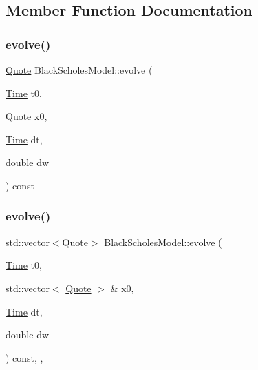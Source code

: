 \subsection{Member Function Documentation}
\hypertarget{class_black_scholes_model_abcbe5f02a1820adf876b1981c78dc43a}{}\label{class_black_scholes_model_abcbe5f02a1820adf876b1981c78dc43a} 
\subsubsection{\texorpdfstring{evolve()}{evolve()}\hspace{0.1cm}{\footnotesize\ttfamily [1/2]}}
{\footnotesize\ttfamily \hyperlink{_name_def_8h_a642a6c5fd87319d922637de0e0bb0305}{Quote} Black\+Scholes\+Model\+::evolve (\begin{DoxyParamCaption}\item[{\hyperlink{_name_def_8h_ac2d3e0ba793497bcca555c7c2cf64ff3}{Time}}]{t0,  }\item[{\hyperlink{_name_def_8h_a642a6c5fd87319d922637de0e0bb0305}{Quote}}]{x0,  }\item[{\hyperlink{_name_def_8h_ac2d3e0ba793497bcca555c7c2cf64ff3}{Time}}]{dt,  }\item[{double}]{dw }\end{DoxyParamCaption}) const}

\hypertarget{class_black_scholes_model_ae7ece51fd9f0eac3f77975cff857216d}{}\label{class_black_scholes_model_ae7ece51fd9f0eac3f77975cff857216d} 
\subsubsection{\texorpdfstring{evolve()}{evolve()}\hspace{0.1cm}{\footnotesize\ttfamily [2/2]}}
{\footnotesize\ttfamily std\+::vector$<$\hyperlink{_name_def_8h_a642a6c5fd87319d922637de0e0bb0305}{Quote}$>$ Black\+Scholes\+Model\+::evolve (\begin{DoxyParamCaption}\item[{\hyperlink{_name_def_8h_ac2d3e0ba793497bcca555c7c2cf64ff3}{Time}}]{t0,  }\item[{std\+::vector$<$ \hyperlink{_name_def_8h_a642a6c5fd87319d922637de0e0bb0305}{Quote} $>$ \&}]{x0,  }\item[{\hyperlink{_name_def_8h_ac2d3e0ba793497bcca555c7c2cf64ff3}{Time}}]{dt,  }\item[{double}]{dw }\end{DoxyParamCaption}) const\hspace{0.3cm}{\ttfamily [inline]}, {\ttfamily [override]}, {\ttfamily [virtual]}}



